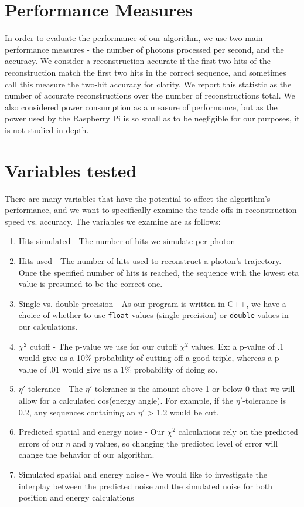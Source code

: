 \section{Performance Measures}
In order to evaluate the performance of our algorithm, we use two main performance measures - the number of photons processed per second, and the accuracy. We consider a reconstruction accurate if the first two hits of the reconstruction match the first two hits in the correct sequence, and sometimes call this measure the two-hit accuracy for clarity. We report this statistic as the number of accurate reconstructions over the number of reconstructions total. We also considered power consumption as a measure of performance, but as the power used by the Raspberry Pi is so small as to be negligible for our purposes, it is not studied in-depth.

\section{Variables tested}
There are many variables that have the potential to affect the algorithm's performance, and we want to specifically examine the trade-offs in reconstruction speed vs. accuracy. The variables we examine are as follows:

\begin{enumerate}
    \item Hits simulated - The number of hits we simulate per photon
    \item Hits used - The number of hits used to reconstruct a photon's trajectory. Once the specified number of hits is reached, the sequence with the lowest eta value is presumed to be the correct one.
    \item Single vs. double precision - As our program is written in C++, we have a choice of whether to use \texttt{float} values (single precision) or \texttt{double} values in our calculations.
    \item $\chi^2$ cutoff - The p-value we use for our cutoff $\chi^2$ values. Ex: a p-value of .1 would give us a 10\% probability of cutting off a good triple, whereas a p-value of .01 would give us a 1\% probability of doing so.
    \item $\eta'$-tolerance - The $\eta'$ tolerance is the amount above 1 or below 0 that we will allow for a calculated cos(energy angle). For example, if the $\eta'$-tolerance is 0.2, any sequences containing an $\eta'$ > 1.2 would be cut.
    \item Predicted spatial and energy noise - Our $\chi^2$ calculations rely on the predicted errors of our $\eta$ and $\eta$ values, so changing the predicted level of error will change the behavior of our algorithm.
    \item Simulated spatial and energy noise - We would like to investigate the interplay between the predicted noise and the simulated noise for both position and energy calculations
\end{enumerate}